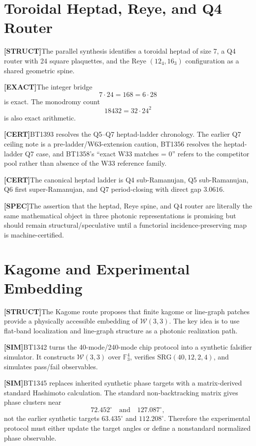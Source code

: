 \documentclass[11pt]{article}
\newcommand{\W}{\mathcal W(3,3)}
\newcommand{\Fthree}{\mathbb F_3}
\newcommand{\claim}[2]{\noindent\textbf{[#1]}\;#2}
\begin{document}
\section{Toroidal Heptad, Reye, and Q4 Router}

\claim{STRUCT}{The parallel synthesis identifies a toroidal heptad of size 7, a Q4 router with 24 square plaquettes, and the Reye \((12_4,16_3)\) configuration as a shared geometric spine.}

\claim{EXACT}{The integer bridge}
\[
7\cdot24=168=6\cdot28
\]
is exact. The monodromy count
\[
18432=32\cdot24^2
\]
is also exact arithmetic.

\claim{CERT}{BT1393 resolves the Q5--Q7 heptad-ladder chronology. The earlier Q7 ceiling note is a pre-ladder/W63-extension caution, BT1356 resolves the heptad-ladder Q7 case, and BT1358's ``exact W33 matches = 0'' refers to the competitor pool rather than absence of the W33 reference family.}

\claim{CERT}{The canonical heptad ladder is Q4 sub-Ramanujan, Q5 sub-Ramanujan, Q6 first super-Ramanujan, and Q7 period-closing with direct gap \(3.0616\).}

\claim{SPEC}{The assertion that the heptad, Reye spine, and Q4 router are literally the same mathematical object in three photonic representations is promising but should remain structural/speculative until a functorial incidence-preserving map is machine-certified.}

\section{Kagome and Experimental Embedding}

\claim{STRUCT}{The Kagome route proposes that finite kagome or line-graph patches provide a physically accessible embedding of \(\W\). The key idea is to use flat-band localization and line-graph structure as a photonic realization path.}

\claim{SIM}{BT1342 turns the 40-mode/240-mode chip protocol into a synthetic falsifier simulator. It constructs \(\W\) over \(\Fthree^4\), verifies \(\mathrm{SRG}(40,12,2,4)\), and simulates pass/fail observables.}

\claim{SIM}{BT1345 replaces inherited synthetic phase targets with a matrix-derived standard Hashimoto calculation. The standard non-backtracking matrix gives phase clusters near}
\[
72.452^\circ \quad\text{and}\quad 127.087^\circ,
\]
not the earlier synthetic targets \(63.435^\circ\) and \(112.208^\circ\). Therefore the experimental protocol must either update the target angles or define a nonstandard normalized phase observable.
\end{document}
